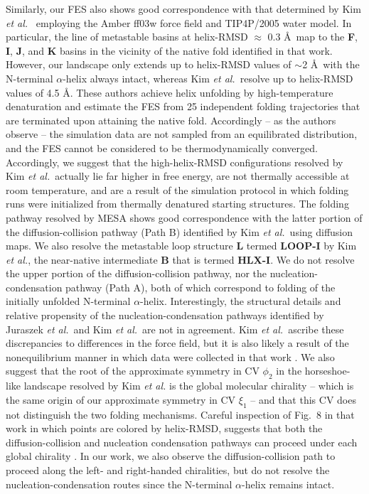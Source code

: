 \documentclass[12pt]{article}
\newcommand*{\blauwr}[1]{#1}
\begin{document}
Similarly, our FES also shows good correspondence with that determined by Kim \textit{et al.}\ \cite{kim2015systematic} employing the Amber ff03w force field\cite{best2010protein} and TIP4P/2005 water model\cite{abascal2005general}. In particular, the line of metastable basins at helix-RMSD $\approx$ 0.3 \AA\ map to the \textbf{F}, \textbf{I}, \textbf{J}, and \textbf{K} basins in the vicinity of the native fold identified in that work. However, our landscape only extends up to helix-RMSD values of $\sim$2 \AA\ with the N-terminal $\alpha$-helix always intact, whereas Kim \textit{et al.}\ resolve up to helix-RMSD values of 4.5 \AA. These authors achieve helix unfolding by high-temperature denaturation and estimate the FES from 25 independent folding trajectories that are terminated upon attaining the native fold. Accordingly -- as the authors observe -- the simulation data are not sampled from an equilibrated distribution, and the FES cannot be considered to be thermodynamically converged. Accordingly, we suggest that the high-helix-RMSD configurations resolved by Kim \textit{et al.}\ actually lie far higher in free energy, are not thermally accessible at room temperature, and are \blauwr{a result} of the simulation protocol in which folding runs were initialized from thermally denatured starting structures. The folding pathway resolved by MESA shows good correspondence with the latter portion of the diffusion-collision pathway (Path B) identified by Kim \textit{et al.}\ using diffusion maps. We also resolve the metastable loop structure \textbf{L} termed \textbf{LOOP-I} by Kim \textit{et al.}, the near-native intermediate \textbf{B} that is termed \textbf{HLX-I}. We do not resolve the upper portion of the diffusion-collision pathway, nor the nucleation-condensation pathway (Path A), both of which correspond to folding of the initially unfolded N-terminal $\alpha$-helix. Interestingly, the structural details and relative propensity of the nucleation-condensation pathways identified by Juraszek \textit{et al.}\ and Kim \textit{et al.}\ are not in agreement. Kim \textit{et al.}\ ascribe these discrepancies to differences in the force field, but it is also likely a result of the nonequilibrium manner in which data were collected in that work \cite{kim2015systematic}. We also suggest that the root of the approximate symmetry in CV $\phi_2$ in the horseshoe-like landscape resolved by Kim \textit{et al.} is the global molecular chirality \cite{kim2015systematic} -- which is the same origin of our approximate symmetry in CV $\xi_1$ -- and that this CV does not distinguish the two folding mechanisms. Careful inspection of Fig.~8 in that work in which points are colored by helix-RMSD, suggests that both the diffusion-collision and nucleation condensation pathways can proceed under each global chirality \cite{kim2015systematic}. In our work, we also observe the diffusion-collision path to proceed along the left- and right-handed chiralities, but do not resolve the nucleation-condensation routes since the N-terminal $\alpha$-helix remains intact.
\end{document}
